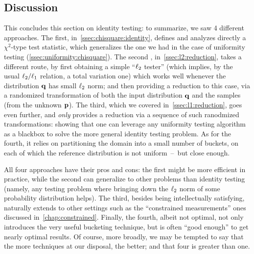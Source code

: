 \subsection{Discussion}
This concludes this section on identity testing: to summarize, we saw 4 different approaches. The first, in~\cref{ssec:chisquare:identity}, defines and analyzes directly a $\chi^2$-type test statistic, which generalizes the one we had in the case of uniformity testing (\cref{ssec:uniformity:chisquare}). The second , in~\cref{ssec:l2:reduction}, takes a different route, by first obtaining a simple ``$\lp[2]$ tester'' (which implies, by the usual $\lp[2]/\lp[1]$ relation, a total variation one) which works well whenever the distribution $\q$ has small $\lp[2]$ norm; and then providing a reduction to this case, via a randomized transformation of both the input distribution $\q$ and the samples (from the unknown $\p$). The third, which we covered in~\cref{ssec:l1:reduction}, goes even further, and \emph{only} provides a reduction via a sequence of such ranodmized transformations: showing that one can leverage any uniformity testing algorithm as a blackbox to solve the more general identity testing problem. As for the fourth, it relies on partitioning the domain into a small number of buckets, on each of which the reference distribution is not uniform~--~but close enough.

All four approaches have their pros and cons: the first might be more efficient in practice, while the second can generalize to other problems than identity testing (namely, any testing problem where bringing down the $\lp[2]$ norm of some probability distribution helps). The third, besides being intellectually satisfying, naturally extends to other settings such as the ``constrained measurements'' ones discussed in~\cref{chap:constrained}. Finally, the fourth, albeit not optimal, not only introduces the very useful bucketing technique, but is often ``good enough'' to get nearly optimal results. Of course, more broadly, we may be tempted to say that the more techniques at our disposal, the better; and that four is greater than one.

